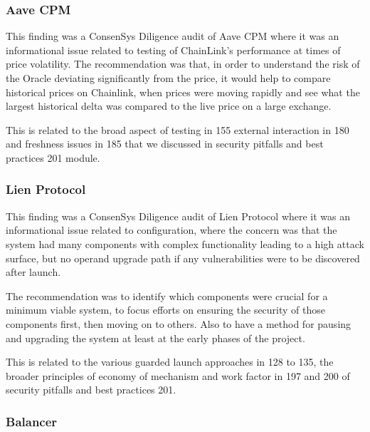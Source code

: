\subsubsection{Aave CPM}\label{aave-cpm}

This finding was a ConsenSys Diligence audit of Aave CPM where it was an
informational issue related to testing of ChainLink's performance at
times of price volatility. The recommendation was that, in order to
understand the risk of the Oracle deviating significantly from the
price, it would help to compare historical prices on Chainlink, when
prices were moving rapidly and see what the largest historical delta was
compared to the live price on a large exchange.

This is related to the broad aspect of testing in 155 external
interaction in 180 and freshness issues in 185 that we discussed in
security pitfalls and best practices 201 module.

\subsubsection{Lien Protocol}\label{lien-protocol}

This finding was a ConsenSys Diligence audit of Lien Protocol where it
was an informational issue related to configuration, where the concern
was that the system had many components with complex functionality
leading to a high attack surface, but no operand upgrade path if any
vulnerabilities were to be discovered after launch.

The recommendation was to identify which components were crucial for a
minimum viable system, to focus efforts on ensuring the security of
those components first, then moving on to others. Also to have a method
for pausing and upgrading the system at least at the early phases of the
project.

This is related to the various guarded launch approaches in 128 to 135,
the broader principles of economy of mechanism and work factor in 197
and 200 of security pitfalls and best practices 201.

\subsubsection{Balancer}\label{balancer}

